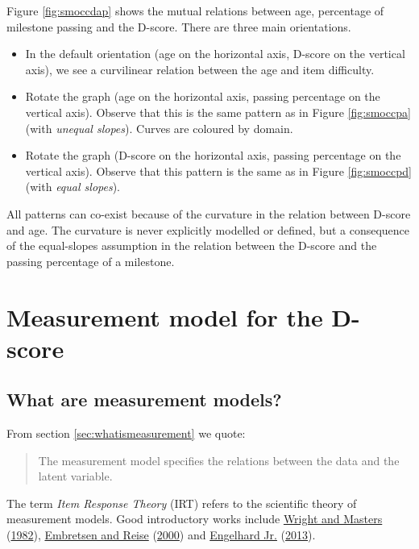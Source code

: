 \documentclass[
]{book}
\providecommand{\tightlist}{%
  \setlength{\itemsep}{0pt}\setlength{\parskip}{0pt}}
\begin{document}
Figure \ref{fig:smoccdap} shows the mutual relations between age, percentage of milestone passing and the D-score. There are three main orientations.

\begin{itemize}
\tightlist
\item
  In the default orientation (age on the horizontal axis, D-score on the vertical axis), we see a curvilinear relation between the age and item difficulty.
\item
  Rotate the graph (age on the horizontal axis, passing percentage on the vertical axis). Observe that this is the same pattern as in Figure \ref{fig:smoccpa} (with \emph{unequal slopes}). Curves are coloured by domain.
\item
  Rotate the graph (D-score on the horizontal axis, passing percentage on the vertical axis). Observe that this pattern is the same as in Figure \ref{fig:smoccpd} (with \emph{equal slopes}).
\end{itemize}

All patterns can co-exist because of the curvature in the relation between D-score and age. The curvature is never explicitly modelled or defined, but a consequence of the equal-slopes assumption in the relation between the D-score and the passing percentage of a milestone.

\hypertarget{sec:measurementmodel}{%
\section{Measurement model for the D-score}\label{sec:measurementmodel}}

\hypertarget{what-are-measurement-models}{%
\subsection{What are measurement models?}\label{what-are-measurement-models}}

From section \ref{sec:whatismeasurement} we quote:

\begin{quote}
The measurement model specifies the relations between the data and the latent variable.
\end{quote}

The term \emph{Item Response Theory} (IRT) refers to the scientific theory of measurement models. Good introductory works include \protect\hyperlink{ref-wright1982}{Wright and Masters} (\protect\hyperlink{ref-wright1982}{1982}), \protect\hyperlink{ref-embretsen2000}{Embretsen and Reise} (\protect\hyperlink{ref-embretsen2000}{2000}) and \protect\hyperlink{ref-engelhard2013}{Engelhard Jr.} (\protect\hyperlink{ref-engelhard2013}{2013}).
\end{document}
